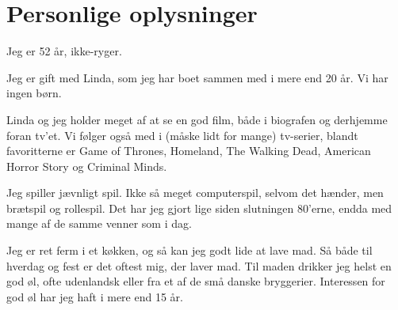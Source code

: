 \documentclass[a4paper,11pt]{article}
\begin{document}
\section*{Personlige oplysninger}

Jeg er 52 år, ikke-ryger.

Jeg er gift med Linda, som jeg har boet sammen med i mere end 20
år. Vi har ingen børn.

Linda og jeg holder meget af at se en god film, både i biografen og
derhjemme foran tv’et. Vi følger også med i (måske lidt for mange)
tv-serier, blandt favoritterne er Game of Thrones, Homeland, The
Walking Dead, American Horror Story og Criminal Minds.

Jeg spiller jævnligt spil. Ikke så meget computerspil, selvom det
hænder, men brætspil og rollespil. Det har jeg gjort lige siden
slutningen 80’erne, endda med mange af de samme venner som i dag.

Jeg er ret ferm i et køkken, og så kan jeg godt lide at lave mad. Så
både til hverdag og fest er det oftest mig, der laver mad. Til maden
drikker jeg helst en god øl, ofte udenlandsk eller fra et af de små
danske bryggerier. Interessen for god øl har jeg haft i mere end 15
år.
\end{document}
